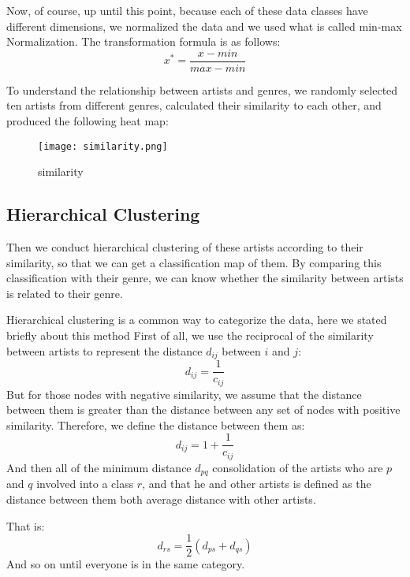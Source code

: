 \documentclass[12pt]{article}  %
\begin{document}
Now, of course, up until this point, because each of these data classes have different dimensions, we normalized the data and we used what is called min-max Normalization. The transformation formula is as follows:
\begin{equation}
x^{*}=\frac{x-min}{max-min}
\end{equation}

To understand the relationship between artists and genres, we randomly selected ten artists from different genres, calculated their similarity to each other, and produced the following heat map:

\begin{figure}[H]
    \centering
    \texttt{[image: similarity.png]}
    \caption{similarity}
    \label{img}
\end{figure}
\subsection{Hierarchical Clustering}
Then we conduct hierarchical clustering of these artists according to their similarity, so that we can get a classification map of them. By comparing this classification with their genre, we can know whether the similarity between artists is related to their genre.

Hierarchical clustering is a common way to categorize the data, here we stated briefly about this method First of all, we use the reciprocal of the similarity between artists to represent the distance $d_{ij}$ between $i$ and $j$:
\begin{equation}
d_{ij}=\frac{1}{c_{ij}}
\end{equation}
But for those nodes with negative similarity, we assume that the distance between them is greater than the distance between any set of nodes with positive similarity. Therefore, we define the distance between them as:
\begin{equation}
d_{ij}=1+\frac{1}{c_{ij}}
\end{equation}
And then all of the minimum distance $d_{pq}$ consolidation of the artists who are $p$ and $q$ involved into a class $r$, and that he and other artists is defined as the distance between them both average distance with other artists.

That is:
\begin{equation}
d_{rs}=\frac{1}{2}(d_{ps}+d_{qs})
\end{equation}
And so on until everyone is in the same category. 
\end{document}
